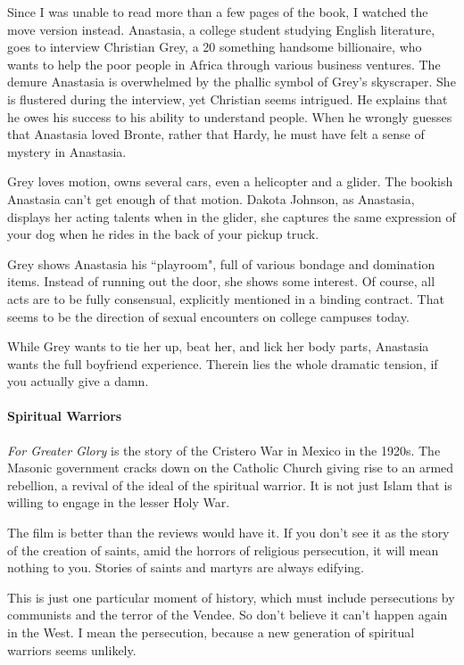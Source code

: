 Since I was unable to read more than a few pages of the book, I watched the move version instead. Anastasia, a college student studying English literature, goes to interview Christian Grey, a 20 something handsome billionaire, who wants to help the poor people in Africa through various business ventures. The demure Anastasia is overwhelmed by the phallic symbol of Grey's skyscraper. She is flustered during the interview, yet Christian seems intrigued. He explains that he owes his success to his ability to understand people. When he wrongly guesses that Anastasia loved Bronte, rather that Hardy, he must have felt a sense of mystery in Anastasia.

Grey loves motion, owns several cars, even a helicopter and a glider. The bookish Anastasia can't get enough of that motion. Dakota Johnson, as Anastasia, displays her acting talents when in the glider, she captures the same expression of your dog when he rides in the back of your pickup truck.

Grey shows Anastasia his ``playroom", full of various bondage and domination items. Instead of running out the door, she shows some interest. Of course, all acts are to be fully consensual, explicitly mentioned in a binding contract. That seems to be the direction of sexual encounters on college campuses today.

While Grey wants to tie her up, beat her, and lick her body parts, Anastasia wants the full boyfriend experience. Therein lies the whole dramatic tension, if you actually give a damn.

\paragraph{Spiritual Warriors}
\emph{For Greater Glory} is the story of the Cristero War in Mexico in the 1920s. The Masonic government cracks down on the Catholic Church giving rise to an armed rebellion, a revival of the ideal of the spiritual warrior. It is not just Islam that is willing to engage in the lesser Holy War.

The film is better than the reviews would have it. If you don't see it as the story of the creation of saints, amid the horrors of religious persecution, it will mean nothing to you. Stories of saints and martyrs are always edifying.

This is just one particular moment of history, which must include persecutions by communists and the terror of the Vendee. So don't believe it can't happen again in the West. I mean the persecution, because a new generation of spiritual warriors seems unlikely.

